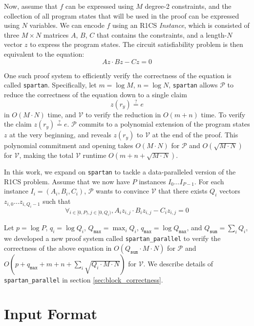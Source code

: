 \documentclass{article}
\newcommand{\code}{\texttt}
\newcommand{\Qsum}{Q_{\mathtt{sum}}}
\newcommand{\Qmax}{Q_{\mathtt{max}}}
\newcommand{\qmax}{q_{\mathtt{max}}}
\renewcommand{\P}{\mathcal{P}}
\newcommand{\V}{\mathcal{V}}
\newcommand{\eqq}{\stackrel{?}{=}}
\begin{document}
Now, assume that $f$ can be expressed using $M$ degree-2 constraints, and the collection of all program states that will be used in the proof can be expressed using $N$ variables. We can encode $f$ using an R1CS \emph{Instance}, which is consisted of three $M\times N$ matrices $A$, $B$, $C$ that contains the constraints, and a length-$N$ vector $z$ to express the program states. The circuit satisfiability problem is then equivalent to the equation:
$$Az \cdot Bz - Cz = 0$$

One such proof system to efficiently verify the correctness of the equation is called \code{spartan}. Specifically, let $m = \log M$, $n = \log N$, \code{spartan} allows $\P$ to reduce the correctness of the equation down to a single claim
$$z(r_y) \eqq e$$
in $O(M\cdot N)$ time, and $\V$ to verify the reduction in $O(m + n)$ time. To verify the claim $z(r_y) \eqq e$. $\P$ commits to a polynomial extension of the program states $z$ at the very beginning, and reveals $z(r_y)$ to $\V$ at the end of the proof. This polynomial commitment and opening takes $O(M\cdot N)$ for $\P$ and $O(\sqrt{M\cdot N})$ for $\V$, making the total $\V$ runtime $O(m + n + \sqrt{M\cdot N})$. 

In this work, we expand on \code{spartan} to tackle a data-paralleled version of the R1CS problem. Assume that we now have $P$ instances $I_0\dots I_{P-1}$. For each instance $I_i = (A_i, B_i, C_i)$, $\P$ wants to convince $\V$ that there exists $Q_i$ vectors $z_{i, 0}\dots z_{i, Q_i-1}$ such that
$$\forall_{i\in [0, P), j \in [0, Q_i)}, A_iz_{i, j} \cdot B_iz_{i, j} - C_iz_{i, j} = 0$$

Let $p = \log P$, $q_i = \log Q_i$, $\Qmax = \max_i Q_i$, $\qmax = \log \Qmax$, and $\Qsum = \sum_i Q_i$, we developed a new proof system called \code{spartan\_parallel} to verify the correctness of the above equation in $O(\Qsum \cdot M \cdot N)$ for $\P$ and $O(p + \qmax + m + n + \sum_i \sqrt{Q_i\cdot M\cdot N})$ for $\V$. We describe details of \code{spartan\_parallel} in section \ref{sec:block_correctness}.


\section{Input Format}\label{sec:input}
\end{document}
